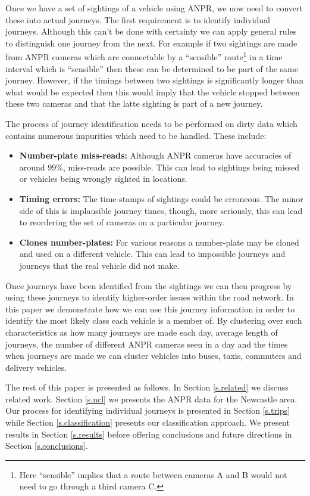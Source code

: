 Once we have a set of sightings of a vehicle using ANPR, we now need to convert these into actual journeys. The first requirement is to identify individual journeys. Although this can't be done with certainty we can apply general rules to distinguish one journey from the next. For example if two sightings are made from ANPR cameras which are connectable by a ``sensible'' route\footnote{Here ``sensible'' implies that a route between cameras A and B would not need to go through a third camera C.} in a time interval which is ``sensible'' then these can be determined to be part of the same journey. However, if the timings between two sightings is significantly longer than what would be expected then this would imply that the vehicle stopped between these two cameras and that the latte sighting is part of a new journey.

The process of journey identification needs to be performed on dirty data which contains numerous impurities which need to be handled. These include:

\begin{itemize}
	\item {\bf Number-plate miss-reads:} Although ANPR cameras have accuracies of around {\color{red}99\%}, miss-reads are possible. This can lead to sightings being missed or vehicles being wrongly sighted in locations.
	\item {\bf Timing errors:} The time-stamps of sightings could be erroneous. The minor side of this is implausible journey times, though, more seriously, this can lead to reordering the set of cameras on a particular journey.
	\item {\bf Clones number-plates:} For various reasons a number-plate may be cloned and used on a different vehicle. This can lead to impossible journeys and journeys that the real vehicle did not make.
\end{itemize}

Once journeys have been identified from the sightings we can then progress by using these journeys to identify higher-order issues within the road network. In this paper we demonstrate how we can use this journey information in order to identify the most likely class each vehicle is a member of. By clustering over such characteristics as how many journeys are made each day, average length of journeys, the number of different ANPR cameras seen in a day and the times when journeys are made we can cluster vehicles into buses, taxis, commuters and delivery vehicles.

The rest of this paper is presented as follows. In Section \ref{s.related} we discuss related work. Section \ref{s.ncl} we presents the ANPR data for the Newcastle area. Our process for identifying individual journeys is presented in Section \ref{s.trips} while Section \ref{s.classification} presents our classification approach. We present results in Section \ref{s.results} before offering conclusions and future directions in Section \ref{s.conclusions}.

